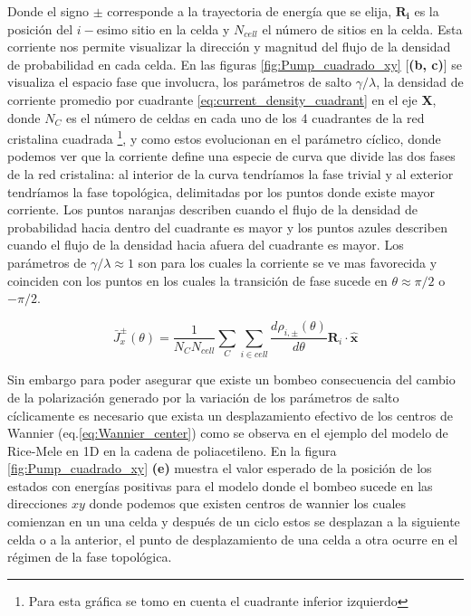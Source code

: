 Donde el signo $\pm$ corresponde a la trayectoria de energía que se elija, $\mathbf{R_i}$ es la posición del $i-$esimo sitio en la celda y $N_{cell}$ el número de sitios en la celda. Esta corriente nos permite visualizar la dirección y magnitud del flujo de la densidad de probabilidad en cada celda. En las figuras \ref{fig:Pump_cuadrado_xy} [\textbf{(b, c)}] se visualiza el espacio fase que involucra, los parámetros de salto $\gamma/\lambda$, la densidad de corriente promedio por cuadrante \ref{eq:current_density_cuadrant} en el eje \textbf{X}, donde $N_C$ es el número de celdas en cada uno de los 4 cuadrantes de la red cristalina cuadrada \footnote{Para esta gráfica se tomo en cuenta el cuadrante inferior izquierdo}, y como estos evolucionan en el parámetro cíclico,  donde podemos ver que la corriente define una especie de curva que divide las dos fases de la red cristalina: al interior de la curva tendríamos la fase trivial y al exterior tendríamos la fase topológica, delimitadas por los puntos donde existe mayor corriente. Los puntos naranjas describen cuando el flujo de la densidad de probabilidad hacia dentro del cuadrante es mayor y los puntos azules describen cuando el flujo de la densidad hacia afuera del cuadrante es mayor. Los parámetros de $\gamma/\lambda \approx 1$ son para los cuales la corriente se ve mas favorecida y coinciden con los puntos en los cuales la transición de fase sucede en $\theta \approx \pi/2 $ o $-\pi/2$.

\begin{equation}
    \label{eq:current_density_cuadrant}
    \bar{J}^{\pm}_x(\theta) =\frac{1}{N_C N_{cell}} \sum_{C} \sum_{i \in cell} \frac{d \rho_{i,\pm}(\theta)}{d\theta} \mathbf{R}_i \cdot \mathbf{\hat{x}}  
\end{equation}

Sin embargo para poder asegurar que existe un bombeo consecuencia del cambio de la polarización generado por la variación de los parámetros de salto cíclicamente es necesario que exista un desplazamiento efectivo de los centros de Wannier (eq.\ref{eq:Wannier_center}) como se observa en el ejemplo del modelo de Rice-Mele en 1D en la cadena de poliacetileno. En la figura \ref{fig:Pump_cuadrado_xy} \textbf{(e)} muestra el valor esperado de la posición de los estados con energías positivas para el modelo donde el bombeo sucede en las direcciones $xy$ donde podemos que existen centros de wannier los cuales comienzan en un una celda y después de un ciclo estos se desplazan a la siguiente celda o a la anterior, el punto de desplazamiento de una celda a otra ocurre en el régimen de la fase topológica. 

